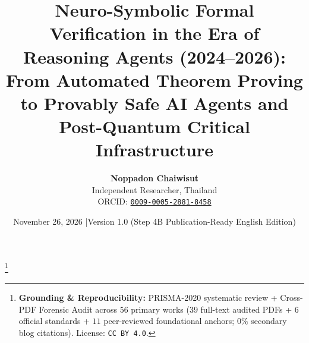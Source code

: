 \documentclass[10pt,twocolumn]{article}
\title{\textbf{Neuro-Symbolic Formal Verification in the Era of Reasoning Agents (2024--2026): From Automated Theorem Proving to Provably Safe AI Agents and Post-Quantum Critical Infrastructure}}
\author{
  \textbf{Noppadon Chaiwisut} \\
  Independent Researcher, Thailand \\
  ORCID: \href{https://orcid.org/0009-0005-2881-8458}{\texttt{0009-0005-2881-8458}}
}
\date{November 26, 2026 \quad|\quad Version 1.0 (Step 4B Publication-Ready English Edition)\vspace{-1.0em}}
\begin{document}
\maketitle
\thispagestyle{plain}

\nocite{demoura2021lean4,yang2023leandojo,aniva2025pantograph,hubert2025alphaproof,tsoukalas2026nexus,wang2025kimina,ren2025deepseekproverv2,lin2025goedelprover,lin2026goedelproverv2,chung2026goedelarchitect,chen2025seedprover,chen2025seedprover15,firsching2026formalconjectures,xin2026axle,carneiro2025lean4lean,yang2026proofgate,nist2024fips203,nist2024fips204,nist2024fips205,alagic2025nistir8545,moody2026nistir8547,ho2022aeneas,ho2026symcrypt,bhargavan2025hax,kobeissi2026theatre,almeida2024kyber,barbosa2024sphincs,chaudhuri2026alphaproofcode,klaus2026rustlean,park2026pqchw,benshahar2026qkd,owasp2025agentic,kim2026sok,debenedetti2024agentdojo,debenedetti2026camel,li2025drift,costa2025fides,zhong2025rtbas,shi2025progent,li2026ace,abdelnabi2026ci,wang2026lean4agent,mondl2026policyascode,lotfi2026a2abreak,agentthread2026,ye2026verina,miranda2026veribench,han2026shadowbench,ammanamanchi2026faults,chen2026reform,mei2026beyondllm,threesurface2026,misu2026specharness,amster2026claimcheck,nawrocki2023proofwidgets4,kripner2025leantree}

\begingroup
\renewcommand\thefootnote{}\footnote{\noindent\textbf{Grounding \& Reproducibility:} PRISMA-2020 systematic review + Cross-PDF Forensic Audit across $56$ primary works ($39$ full-text audited PDFs + $6$ official standards + $11$ peer-reviewed foundational anchors; $0\%$ secondary blog citations). License: \texttt{CC BY 4.0}.}
\addtocounter{footnote}{-1}
\endgroup
\end{document}
